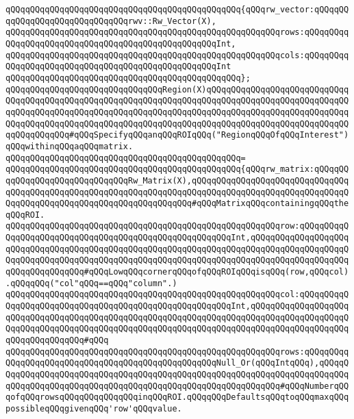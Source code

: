 \verb|qQQqqQQqqQQqqQQqqQQqqQQqqQQqqQQqqQQqqQQqqQQqqQQq{qQQqrw_vector:qQQqqQQqqQQqqQQqqQQqqQQqqQQqqQQqrwv::Rw_Vector(X),|\newline
\verb|qQQqqQQqqQQqqQQqqQQqqQQqqQQqqQQqqQQqqQQqqQQqqQQqqQQqqQQqrows:qQQqqQQqqQQqqQQqqQQqqQQqqQQqqQQqqQQqqQQqqQQqqQQqqQQqInt,|\newline
\verb|qQQqqQQqqQQqqQQqqQQqqQQqqQQqqQQqqQQqqQQqqQQqqQQqqQQqqQQqcols:qQQqqQQqqQQqqQQqqQQqqQQqqQQqqQQqqQQqqQQqqQQqqQQqqQQqInt|\newline
\verb|qQQqqQQqqQQqqQQqqQQqqQQqqQQqqQQqqQQqqQQqqQQqqQQq};|\newline
\newline
\verb|qQQqqQQqqQQqqQQqqQQqqQQqqQQqqQQqRegion(X)qQQqqQQqqQQqqQQqqQQqqQQqqQQqqQQqqQQqqQQqqQQqqQQqqQQqqQQqqQQqqQQqqQQqqQQqqQQqqQQqqQQqqQQqqQQqqQQqqQQqqQQqqQQqqQQqqQQqqQQqqQQqqQQqqQQqqQQqqQQqqQQqqQQqqQQqqQQqqQQqqQQqqQQqqQQqqQQqqQQqqQQqqQQqqQQqqQQqqQQqqQQqqQQqqQQqqQQqqQQqqQQqqQQqqQQqqQQqqQQqqQQqqQQqqQQq#qQQqSpecifyqQQqanqQQqROIqQQq("RegionqQQqOfqQQqInterest")qQQqwithinqQQqaqQQqmatrix.|\newline
\verb|qQQqqQQqqQQqqQQqqQQqqQQqqQQqqQQqqQQqqQQqqQQqqQQq=|\newline
\verb|qQQqqQQqqQQqqQQqqQQqqQQqqQQqqQQqqQQqqQQqqQQqqQQq{qQQqrw_matrix:qQQqqQQqqQQqqQQqqQQqqQQqqQQqqQQqRw_Matrix(X),qQQqqQQqqQQqqQQqqQQqqQQqqQQqqQQqqQQqqQQqqQQqqQQqqQQqqQQqqQQqqQQqqQQqqQQqqQQqqQQqqQQqqQQqqQQqqQQqqQQqqQQqqQQqqQQqqQQqqQQqqQQqqQQqqQQqqQQqqQQq#qQQqMatrixqQQqcontainingqQQqtheqQQqROI.|\newline
\verb|qQQqqQQqqQQqqQQqqQQqqQQqqQQqqQQqqQQqqQQqqQQqqQQqqQQqqQQqrow:qQQqqQQqqQQqqQQqqQQqqQQqqQQqqQQqqQQqqQQqqQQqqQQqqQQqqQQqInt,qQQqqQQqqQQqqQQqqQQqqQQqqQQqqQQqqQQqqQQqqQQqqQQqqQQqqQQqqQQqqQQqqQQqqQQqqQQqqQQqqQQqqQQqqQQqqQQqqQQqqQQqqQQqqQQqqQQqqQQqqQQqqQQqqQQqqQQqqQQqqQQqqQQqqQQqqQQqqQQqqQQqqQQqqQQqqQQq#qQQqLowqQQqcornerqQQqofqQQqROIqQQqisqQQq(row,qQQqcol).qQQqqQQq("col"qQQq==qQQq"column".)|\newline
\verb|qQQqqQQqqQQqqQQqqQQqqQQqqQQqqQQqqQQqqQQqqQQqqQQqqQQqqQQqcol:qQQqqQQqqQQqqQQqqQQqqQQqqQQqqQQqqQQqqQQqqQQqqQQqqQQqqQQqInt,qQQqqQQqqQQqqQQqqQQqqQQqqQQqqQQqqQQqqQQqqQQqqQQqqQQqqQQqqQQqqQQqqQQqqQQqqQQqqQQqqQQqqQQqqQQqqQQqqQQqqQQqqQQqqQQqqQQqqQQqqQQqqQQqqQQqqQQqqQQqqQQqqQQqqQQqqQQqqQQqqQQqqQQqqQQqqQQq#qQQq|\newline
\verb|qQQqqQQqqQQqqQQqqQQqqQQqqQQqqQQqqQQqqQQqqQQqqQQqqQQqqQQqrows:qQQqqQQqqQQqqQQqqQQqqQQqqQQqqQQqqQQqqQQqqQQqqQQqqQQqNull_Or(qQQqIntqQQq),qQQqqQQqqQQqqQQqqQQqqQQqqQQqqQQqqQQqqQQqqQQqqQQqqQQqqQQqqQQqqQQqqQQqqQQqqQQqqQQqqQQqqQQqqQQqqQQqqQQqqQQqqQQqqQQqqQQqqQQqqQQqqQQqqQQq#qQQqNumberqQQqofqQQqrowsqQQqqQQqqQQqqQQqinqQQqROI.qQQqqQQqDefaultsqQQqtoqQQqmaxqQQqpossibleqQQqgivenqQQq'row'qQQqvalue.|\newline
